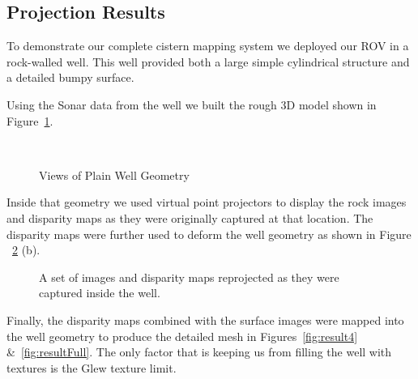 \documentclass[a4paper,twoside]{article}
\begin{document}
\subsection{Projection Results}
To demonstrate our complete cistern mapping system we deployed our ROV in a rock-walled well.
This well provided both a large simple cylindrical structure and a detailed bumpy surface.

Using the Sonar data from the well we built the rough 3D model shown in Figure~\ref{fig:result1}. 

\begin{figure}[!h]
	\centering
		\quad %
		\\%
		\caption{Views of Plain Well Geometry}
		\label{fig:result1}
\end{figure}

Inside that geometry we used virtual point projectors to display the rock images and disparity maps as they were originally captured at that location.  
The disparity maps were further used to deform the well geometry as shown in Figure ~\ref{fig:result2} (b).

\begin{figure}[!h]
	\centering
		\quad %
		\caption{A set of images and disparity maps reprojected as they were captured inside the well.}
		\label{fig:result2}
\end{figure}

%

Finally, the disparity maps combined with the surface images were mapped into the well geometry to produce the detailed mesh in Figures~\ref{fig:result4} \&~\ref{fig:resultFull}.  The only factor that is keeping us from filling the well with textures is the Glew texture limit. 
\end{document}
